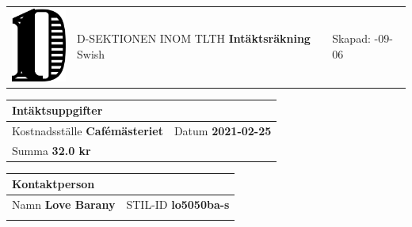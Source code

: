 \documentclass{article}
\newcommand{\skapad}{2021-09-06}
\newcommand{\kostnadsstalle}{Cafémästeriet}
\newcommand{\typ}{Swish}
\newcommand{\datum}{2021-02-25}
\newcommand{\summa}{32.0 kr}
\newcommand{\namn}{Love Barany}
\newcommand{\stilid}{lo5050ba-s}
\begin{document}
    \hspace{-0.3in}
    \begin{tabular}{p{1.0in}p{3.5in}p{2in}}
    \includegraphics[width=0.8in]{D-symbol.pdf} &
    \vspace{-1in}
    {\large \uppercase{D-sektionen inom TLTH}} \newline \newline
    {\Huge \textsf{\textbf{Intäktsräkning}}}
    \newline \newline
    {\large \typ}&
    \vspace{-1in}
    Skapad: \newline
    \skapad \newline
    \end{tabular}

    \vspace{0.5in}
    \hspace{-0.3in}
    \begin{tabular}{|p{1.4in}|p{0.9in}|}
        \multicolumn{2}{l}{Intäktsuppgifter} \\
        \hline
        {\footnotesize Kostnadsställe} \newline \textbf{\kostnadsstalle}&
        {\footnotesize Datum} \newline \textbf{\datum} \\
        \hline
        \multicolumn{2}{|p{2.3in}|}{{\footnotesize Summa} \newline \textbf{\summa}} \\
        \hline
    \end{tabular}
    \hspace{0.1in}
    \begin{tabular}{|p{1.3in}|p{0.9in}|p{1.1in}|}
        \multicolumn{3}{l}{Kontaktperson} \\
        \hline
        \multicolumn{2}{|p{2.2in}|}{{\footnotesize Namn} \newline \textbf{\namn}}
          &
         {\footnotesize STIL-ID} \newline \textbf{\stilid} \\
         \hline
         \multicolumn{3}{p{3.3in}}{{\footnotesize \quad} \newline \textbf{\quad}}
    \end{tabular}
\end{document}
